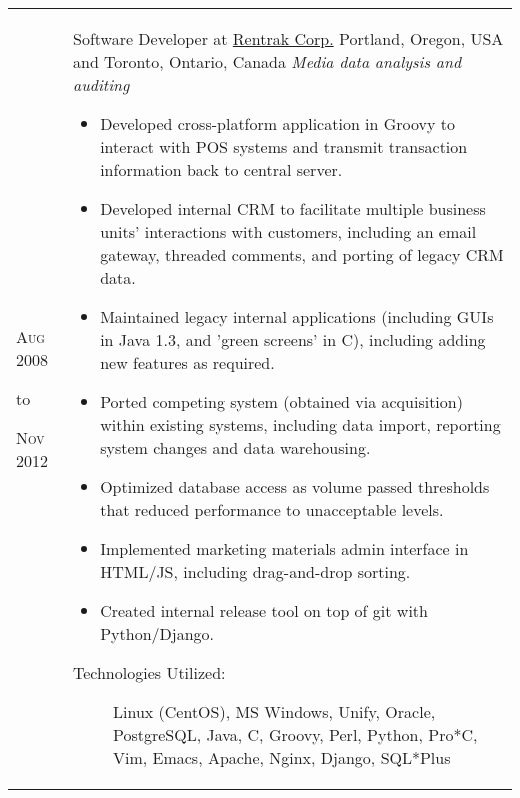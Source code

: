 \documentclass[a4paper,10pt]{article}
\begin{document}
        \begin{tabular}{ R{1.5cm} | p{10.5cm} }
            \hfill \textsc{Aug 2008}\newline
            \begin{center} to \end{center}
            \hfill \textsc{Nov 2012} &

            Software Developer at \href{https://en.wikipedia.org/wiki/Rentrak}{Rentrak Corp.}\newline
            Portland, Oregon, USA and Toronto, Ontario, Canada\newline
            \emph{Media data analysis and auditing} \newline
            \fontsize{9pt}{10pt}\selectfont
            \begin{itemize}
                \item Developed cross-platform application in Groovy to interact with POS
                    systems and transmit transaction information back to central server.
                \item Developed internal CRM to facilitate multiple business units' interactions
                    with customers, including an email gateway, threaded comments, and porting of
                    legacy CRM data.
                \item Maintained legacy internal applications (including GUIs in Java 1.3, and
                    'green screens' in C), including adding new features as required.
                \item Ported competing system (obtained via acquisition) within existing systems,
                    including data import, reporting system changes and data warehousing.
                \item Optimized database access as volume passed thresholds that reduced
                    performance to unacceptable levels.
                \item Implemented marketing materials admin interface in HTML/JS, including
                    drag-and-drop sorting.
                \item Created internal release tool on top of git with Python/Django.
            \end{itemize}
            \bigskip
            \begin{description}
                \item[Technologies Utilized:]
                    Linux (CentOS), MS Windows, Unify, Oracle, PostgreSQL,
                    Java, C, Groovy, Perl, Python, Pro*C, Vim, Emacs, Apache,
                    Nginx, Django, SQL*Plus
            \end{description}
            \\
        \end{tabular}
    
\end{document}
